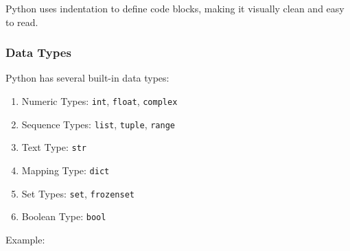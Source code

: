 Python uses indentation to define code blocks, making it visually clean
and easy to read.

\begin{Shaded}
\begin{Highlighting}[]
    \NormalTok{(}\SpecialCharTok{\{}\SpecialCharTok{\}}\NormalTok{)}

\NormalTok{)}
\end{Highlighting}
\end{Shaded}

\hypertarget{data-types}{%
\subsubsection{Data Types}\label{data-types}}

Python has several built-in data types:

\begin{enumerate}
\def\labelenumi{\arabic{enumi}.}
\tightlist
\item
  Numeric Types: \texttt{int}, \texttt{float}, \texttt{complex}
\item
  Sequence Types: \texttt{list}, \texttt{tuple}, \texttt{range}
\item
  Text Type: \texttt{str}
\item
  Mapping Type: \texttt{dict}
\item
  Set Types: \texttt{set}, \texttt{frozenset}
\item
  Boolean Type: \texttt{bool}
\end{enumerate}

Example:

\begin{Shaded}
\begin{Highlighting}[]
\OperatorTok{=}        
\OperatorTok{=}     

\OperatorTok{=}\NormalTok{ [}\NormalTok{, }\NormalTok{, }\NormalTok{]}
\OperatorTok{=}\NormalTok{ (}\NormalTok{, }\NormalTok{, }\NormalTok{)}

\OperatorTok{=} 

\OperatorTok{=}\NormalTok{ \{}\NormalTok{: }\NormalTok{, }\NormalTok{: }\NormalTok{\}}

\OperatorTok{=}\NormalTok{ \{}\NormalTok{, }\NormalTok{, }\NormalTok{, }\NormalTok{, }\NormalTok{\}}

\OperatorTok{=} 
\end{Highlighting}
\end{Shaded}

